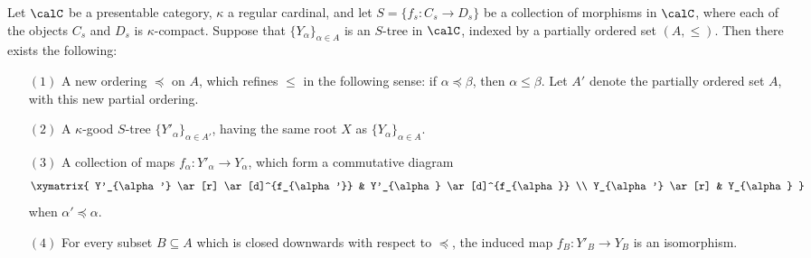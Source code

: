\begin{lemma}\label{humber2}
Let $\calC$ be a presentable category, $\kappa$ a regular cardinal, and let $S = \{ f_{s}: C_{s} \rightarrow D_{s} \}$ be a collection of morphisms in $\calC$, where each of the objects $C_{s}$ and $D_{s}$ is $\kappa$-compact. Suppose that $\{ Y_{\alpha} \}_{\alpha \in A}$ is an $S$-tree in $\calC$, indexed by a partially ordered set $(A, \leq)$. Then there exists the following:
\begin{itemize}
\item[$(1)$] A new ordering $\preceq$ on $A$, which refines $\leq$ in the following sense:
if $\alpha \preceq \beta$, then $\alpha \leq \beta$. Let $A'$ denote the partially ordered set $A$, with this new partial ordering.
\item[$(2)$] A $\kappa$-good $S$-tree $\{ Y'_{\alpha} \}_{\alpha \in A'}$, having the same root
$X$ as $\{ Y_{\alpha} \}_{\alpha \in A}$.
\item[$(3)$] A collection of maps $f_{\alpha}: Y'_{\alpha} \rightarrow Y_{\alpha}$, which form a commutative diagram
$$ \xymatrix{ Y'_{\alpha'} \ar[r] \ar[d]^{f_{\alpha'}} & Y'_{\alpha} \ar[d]^{f_{\alpha}} \\
Y_{\alpha'} \ar[r] & Y_{\alpha} }$$
when $\alpha' \preceq \alpha$.
\item[$(4)$] For every subset $B \subseteq A$ which is closed downwards with respect to $\preceq$, the induced map $f_{B}: Y'_{B} \rightarrow Y_{B}$ is an isomorphism.
\end{itemize}
\end{lemma}

